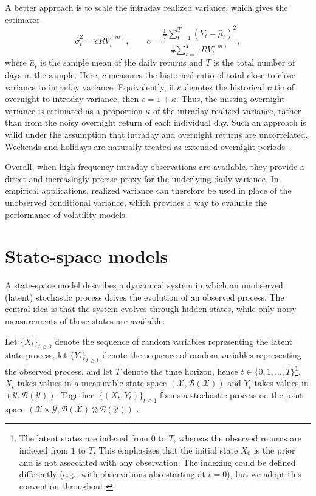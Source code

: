 A better approach is to scale the intraday realized variance, which gives the estimator
\begin{equation}
    \hat{\sigma}_t^2 = c RV_t^{(m)}, \qquad c = \frac{\frac{1}{T}\sum_{t=1}^T \left(Y_t - \hat{\mu}_t\right)^2}{\frac{1}{T}\sum_{t=1}^T RV_t^{(m)}},
\end{equation}
where $\hat{\mu}_t$ is the sample mean of the daily returns and $T$ is the total number of days in the sample.
Here, $c$ measures the historical ratio of total close-to-close variance to intraday variance. Equivalently, if $\kappa$ denotes the historical ratio of overnight to intraday variance, then $c=1+\kappa$.
Thus, the missing overnight variance is estimated as a proportion $\kappa$ of the intraday realized variance, rather than from the noisy overnight return of each individual day. Such an approach is valid under the assumption that intraday and overnight returns are uncorrelated.
Weekends and holidays are naturally treated as extended overnight periods \cite{hansen2005forecast,martens2002measuring}.

Overall, when high-frequency intraday observations are available, they provide a direct and increasingly precise proxy for the underlying daily variance. In empirical applications, realized variance can therefore be used in place of the unobserved conditional variance, which provides a way to evaluate the performance of volatility models. 

\section{State-space models}
\label{sec:state_space_models}
A state-space model describes a dynamical system in which an unobserved (latent) stochastic process drives the evolution of an observed process. The central idea is that the system evolves through hidden states, while only noisy measurements of those states are available.

Let $\{X_t\}_{t \geq 0}$ denote the sequence of random variables representing the latent state process, let $\{Y_t\}_{t \geq 1}$ denote the sequence of random variables representing the observed process, and let $T$ denote the time horizon, hence $t \in \{0, 1, \ldots, T\}$\footnote{The latent states are indexed from $0$ to $T$, whereas the observed returns are indexed from $1$ to $T$. This emphasizes that the initial state $X_0$ is the prior and is not associated with any observation. The indexing could be defined differently (e.g., with observations also starting at $t=0$), but we adopt this convention throughout.}. 
$X_t$ takes values in a measurable state space $(\mathcal{X}, \mathcal{B}(\mathcal{X}))$ and $Y_t$ takes values in $(\mathcal{Y}, \mathcal{B}(\mathcal{Y}))$. Together, $\{(X_t, Y_t)\}_{t \geq 1}$ forms a stochastic process on the joint space $(\mathcal{X} \times \mathcal{Y}, \mathcal{B}(\mathcal{X}) \otimes \mathcal{B}(\mathcal{Y}))$ \cite{chopin2020smc}.

